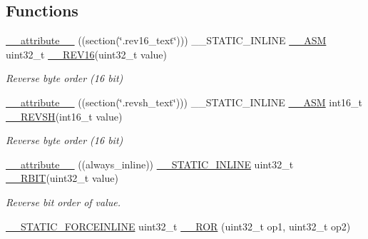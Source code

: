\subsection*{Functions}
\begin{DoxyCompactItemize}
\item 
\hyperlink{group___c_m_s_i_s___core___instruction_interface_gae84a2733711339c5eefeb0d899506b96}{\+\_\+\+\_\+attribute\+\_\+\+\_\+} ((section(\char`\"{}.rev16\+\_\+text\char`\"{}))) \+\_\+\+\_\+\+S\+T\+A\+T\+I\+C\+\_\+\+I\+N\+L\+I\+NE \hyperlink{cmsis__iccarm_8h_a1378040bcf22428955c6e3ce9c2053cd}{\+\_\+\+\_\+\+A\+SM} uint32\+\_\+t \hyperlink{group___c_m_s_i_s___core___instruction_interface_gaa12aedd096506c9639c1581acd5c6a78}{\+\_\+\+\_\+\+R\+E\+V16}(uint32\+\_\+t value)
\begin{DoxyCompactList}\small\item\em Reverse byte order (16 bit) \end{DoxyCompactList}\item 
\hyperlink{group___c_m_s_i_s___core___instruction_interface_gabe2b619a40cc0a7ffa8f765249ccf682}{\+\_\+\+\_\+attribute\+\_\+\+\_\+} ((section(\char`\"{}.revsh\+\_\+text\char`\"{}))) \+\_\+\+\_\+\+S\+T\+A\+T\+I\+C\+\_\+\+I\+N\+L\+I\+NE \hyperlink{cmsis__iccarm_8h_a1378040bcf22428955c6e3ce9c2053cd}{\+\_\+\+\_\+\+A\+SM} int16\+\_\+t \hyperlink{group___c_m_s_i_s___core___instruction_interface_gacb695341318226a5f69ed508166622ac}{\+\_\+\+\_\+\+R\+E\+V\+SH}(int16\+\_\+t value)
\begin{DoxyCompactList}\small\item\em Reverse byte order (16 bit) \end{DoxyCompactList}\item 
\hyperlink{group___c_m_s_i_s___core___instruction_interface_gab926fe7178a379c3a7c0410b06fcb661}{\+\_\+\+\_\+attribute\+\_\+\+\_\+} ((always\+\_\+inline)) \hyperlink{cmsis__iccarm_8h_aba87361bfad2ae52cfe2f40c1a1dbf9c}{\+\_\+\+\_\+\+S\+T\+A\+T\+I\+C\+\_\+\+I\+N\+L\+I\+NE} uint32\+\_\+t \hyperlink{group___c_m_s_i_s___core___instruction_interface_gaf944a7b7d8fd70164cca27669316bcf7}{\+\_\+\+\_\+\+R\+B\+IT}(uint32\+\_\+t value)
\begin{DoxyCompactList}\small\item\em Reverse bit order of value. \end{DoxyCompactList}\item 
\hyperlink{cmsis__iccarm_8h_ab904513442afdf77d4f8c74f23cbb040}{\+\_\+\+\_\+\+S\+T\+A\+T\+I\+C\+\_\+\+F\+O\+R\+C\+E\+I\+N\+L\+I\+NE} uint32\+\_\+t \hyperlink{group___c_m_s_i_s___core___instruction_interface_gab16acb6456176f1e87a4f2724c2b6028}{\+\_\+\+\_\+\+R\+OR} (uint32\+\_\+t op1, uint32\+\_\+t op2)

\end{DoxyCompactItemize}
